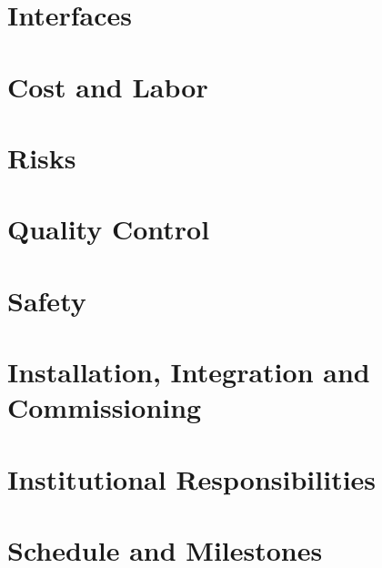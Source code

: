 



\section{Interfaces}
\label{sec:sp-calib-intfc}



\section{Cost and Labor}
\label{sec:sp-calib-cost}





\section{Risks}
\label{sec:sp-calib-risks}


\section{Quality Control}
\label{sec:sp-calib-qc}


\section{Safety}
\label{sec:sp-calib-safe}


\section{Installation, Integration and Commissioning}
\label{sec:sp-calib-iic}



\section{Institutional Responsibilities}
\label{sec:sp-calib-resp}


\section{Schedule and Milestones}
\label{sec:sp-calib-sched}

